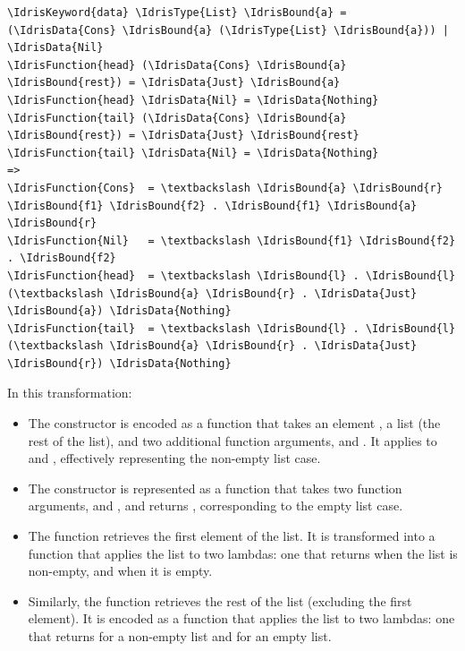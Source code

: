 \documentclass{IEEEtran}
\begin{document}
\begin{Verbatim}
\IdrisKeyword{data} \IdrisType{List} \IdrisBound{a} = (\IdrisData{Cons} \IdrisBound{a} (\IdrisType{List} \IdrisBound{a})) | \IdrisData{Nil}
\IdrisFunction{head} (\IdrisData{Cons} \IdrisBound{a} \IdrisBound{rest}) = \IdrisData{Just} \IdrisBound{a}
\IdrisFunction{head} \IdrisData{Nil} = \IdrisData{Nothing}
\IdrisFunction{tail} (\IdrisData{Cons} \IdrisBound{a} \IdrisBound{rest}) = \IdrisData{Just} \IdrisBound{rest}
\IdrisFunction{tail} \IdrisData{Nil} = \IdrisData{Nothing}
=>
\IdrisFunction{Cons}  = \textbackslash \IdrisBound{a} \IdrisBound{r} \IdrisBound{f1} \IdrisBound{f2} . \IdrisBound{f1} \IdrisBound{a} \IdrisBound{r}
\IdrisFunction{Nil}   = \textbackslash \IdrisBound{f1} \IdrisBound{f2} . \IdrisBound{f2}
\IdrisFunction{head}  = \textbackslash \IdrisBound{l} . \IdrisBound{l} (\textbackslash \IdrisBound{a} \IdrisBound{r} . \IdrisData{Just} \IdrisBound{a}) \IdrisData{Nothing}
\IdrisFunction{tail}  = \textbackslash \IdrisBound{l} . \IdrisBound{l} (\textbackslash \IdrisBound{a} \IdrisBound{r} . \IdrisData{Just} \IdrisBound{r}) \IdrisData{Nothing}
\end{Verbatim}

\par In this transformation:
\begin{itemize}
    \item The constructor  is encoded as a function that takes an element , a list  (the rest of the list), and two additional function arguments,  and . It applies  to  and , effectively representing the non-empty list case.
    \item The constructor  is represented as a function that takes two function arguments,  and , and returns , corresponding to the empty list case.
    \item The function  retrieves the first element of the list. It is transformed into a function that applies the list  to two lambdas: one that returns   when the list is non-empty, and  when it is empty.
    \item Similarly, the function  retrieves the rest of the list (excluding the first element). It is encoded as a function that applies the list  to two lambdas: one that returns   for a non-empty list and  for an empty list.
\end{itemize}
\end{document}
